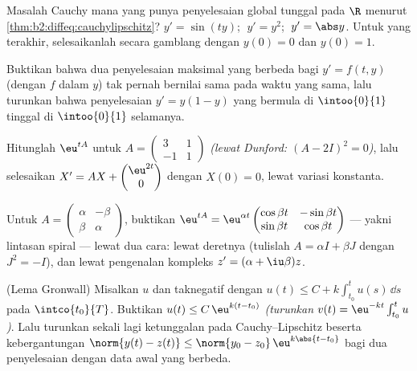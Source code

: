 \begin{exercise}[$\star$]\label{exo:b2:diffeq:2}
Masalah Cauchy mana yang punya penyelesaian global tunggal pada $\R$ menurut
\cref{thm:b2:diffeq:cauchylipschitz}? $y' = \sin(ty)$; $\;y' =
y^2$; $\;y' = \abs y$. Untuk yang terakhir, selesaikanlah secara gamblang dengan $y(0) =
0$ dan $y(0) = 1$.
\end{exercise}

\begin{exercise}[$\star$]\label{exo:b2:diffeq:3}
Buktikan bahwa dua penyelesaian maksimal yang berbeda bagi $y' = f(t,y)$ (dengan $f$
 dalam $y$) tak pernah bernilai sama pada waktu yang sama, lalu
turunkan bahwa penyelesaian $y' = y(1 - y)$ yang bermula di
$\intoo{0}{1}$ tinggal di $\intoo{0}{1}$ selamanya.
\end{exercise}

\begin{exercise}[$\star\star$]\label{exo:b2:diffeq:4}
Hitunglah $\eu^{tA}$ untuk $A = \begin{pmatrix} 3 & 1\\ -1 &
1\end{pmatrix}$ \emph{(lewat Dunford: $(A - 2I)^2 = 0$)}, lalu selesaikan $X' =
AX + \begin{pmatrix} \eu^{2t}\\ 0\end{pmatrix}$ dengan $X(0) = 0$, lewat
variasi konstanta.
\end{exercise}

\begin{exercise}[$\star\star$]\label{exo:b2:diffeq:5}
Untuk $A = \begin{pmatrix} \alpha & -\beta\\ \beta &
\alpha\end{pmatrix}$, buktikan $\eu^{tA} =
\eu^{\alpha t}\begin{pmatrix} \cos\beta t & -\sin\beta t\\
\sin\beta t & \cos\beta t\end{pmatrix}$ --- yakni lintasan spiral ---
lewat dua cara: lewat deretnya (tulislah $A = \alpha I + \beta J$ dengan $J^2 =
-I$), dan lewat pengenalan kompleks $z' = (\alpha +
\iu\beta)z$.
\end{exercise}

\begin{exercise}[$\star\star$]\label{exo:b2:diffeq:6}
(Lema Gronwall) Misalkan $u$  dan taknegatif dengan $u(t)
\leq C + k\int_{t_0}^{t} u(s)\,\dd s$ pada $\intco{t_0}{T}$. Buktikan
$u(t) \leq C\,\eu^{k(t - t_0)}$ \emph{(turunkan $v(t) =
\eu^{-kt}\int_{t_0}^t u$)}. Lalu turunkan sekali lagi ketunggalan pada
Cauchy--Lipschitz beserta kebergantungan  $\norm{y(t) -
z(t)} \leq \norm{y_0 - z_0}\,\eu^{k\abs{t - t_0}}$ bagi dua
penyelesaian dengan data awal yang berbeda.
\end{exercise}

